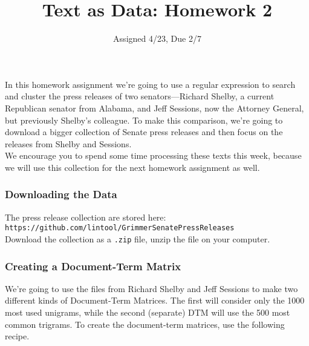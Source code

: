 \documentclass[12pt,letterpaper]{article}
\title{Text as Data: Homework 2}
\date{Assigned 4/23, Due 2/7}
\begin{document}
\maketitle


In this homework assignment we're going to use a regular expression to search and cluster the press releases of two senators---Richard Shelby, a current Republican senator from Alabama, and Jeff Sessions, now the Attorney General, but previously Shelby's colleague.  To make this comparison, we're going to download a bigger collection of Senate press releases and then focus on the releases from Shelby and Sessions.  \\

We encourage you to spend some time processing these texts this week, because we will use this collection for the next homework assignment as well.  

\subsubsection*{Downloading the Data}

The press release collection are stored here:\\
{\tt https://github.com/lintool/GrimmerSenatePressReleases} \\

Download the collection as a {\tt .zip} file, unzip the file on your computer.  


\subsubsection*{Creating a Document-Term Matrix}

We're going to use the files from Richard Shelby and Jeff Sessions to make two different kinds of Document-Term Matrices. The first will consider only the 1000 most used unigrams, while the second (separate) DTM will use the 500 most common trigrams. To create the document-term matrices, use the following recipe.
\end{document}
